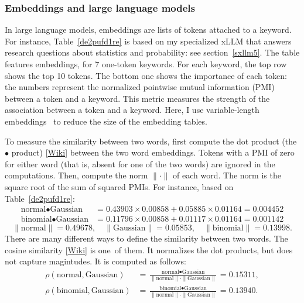 \documentclass[oneside,10pt]{book}
\begin{document}
\subsubsection{Embeddings and large language models}

In large language models, embeddings are lists of tokens attached to a keyword.  For instance, Table~\ref{de2pufd1re} is based on my specialized xLLM that answers research questions about statistics and probability: see section~\ref{sxllm5}. The table features embeddings, for 7 one-token keywords. For each keyword, the top row 
 shows the top 10 tokens. The bottom one shows the importance of each token: the numbers represent the 
normalized \textcolor{index}{pointwise mutual information} (PMI) between a token and a keyword. This metric measures the strength of the association between a token and a keyword. Here, I use 
\textcolor{index}{variable-length embeddings}~\cite{vle23} to reduce the size of the embedding tables.

To measure the similarity between two words, first compute the \textcolor{index}{dot product} 
(the $\bullet$ product)
[\href{https://en.wikipedia.org/wiki/Dot_product}{Wiki}] between the two word embeddings. Tokens with a PMI of zero for either word (that is, absent for one of the two words) are ignored in the computations.
 Then, compute the norm $\|\cdot\|$ of each word. The norm is the square root of the sum of squared PMIs. For instance,
 based on Table~\ref{de2pufd1re}:
\begin{align}
\text{normal} \bullet  \text{Gaussian} & = 0.43903 \times 0.00858 + 0.05885 \times 0.01164 =  0.004452 \nonumber \\
\text{binomial} \bullet\text{Gaussian} & = 0.11796 \times 0.00858 +  0.01117 \times 0.01164 = 0.001142 \nonumber
\end{align}
$$
\| \text{normal} \| = 0.49678, \quad \| \text{Gaussian} \| =0.05853, \quad \| \text{binomial} \| = 0.13998.
$$
There are many different ways to define the similarity between two words. The
\textcolor{index}{cosine similarity}  [\href{https://en.wikipedia.org/wiki/Cosine_similarity}{Wiki}]
 is one~of them. It normalizes the dot products, but does not capture magintudes. It is computed as follows:
\begin{align}
\rho(\text{normal},  \text{Gaussian}) & = 
\frac{\text{normal} \bullet  \text{Gaussian}}{\| \text{normal} \| \cdot \| \text{Gaussian} \|}  
= 0.15311, \nonumber \\[0.5ex]
   \rho(\text{binomial}, \text{Gaussian}) & =
 \frac{\text{binomial} \bullet  \text{Gaussian}}{\| \text{normal} \| \cdot \| \text{Gaussian} \|}  
 =  0.13940. \nonumber
\end{align}
\end{document}
